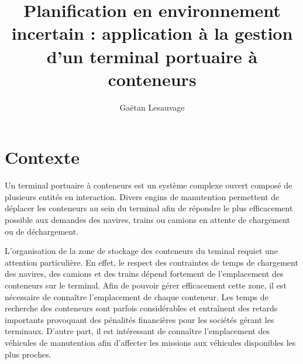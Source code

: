 \documentclass{roadef2010}
\begin{document}
\title{Planification en environnement incertain : application \`a la gestion d'un terminal portuaire \`{a} conteneurs}
\def\shorttitle{Planification avec incertitude : cas d'un terminal \`{a} conteneurs}
\author{Ga\"{e}tan Lesauvage}

{}

\maketitle
\thispagestyle{empty}


\section{Contexte}

Un terminal portuaire \`{a} conteneurs est un syst\`{e}me complexe ouvert compos\'{e} de plusieurs entit\'{e}s en interaction. Divers engins de manutention permettent de d\'{e}placer les conteneurs au sein du terminal afin de r\'{e}pondre le plus efficacement possible aux demandes des navires, trains ou camions en attente de chargement ou de d\'{e}chargement.


L'organisation de la zone de stockage des conteneurs du teminal requiet une attention particuli\`ere. 
En effet, le respect des contraintes de temps de chargement des navires, des camions et des trains d\'{e}pend fortement de l'emplacement des conteneurs sur le terminal.
Afin de pouvoir g\'{e}rer efficacement cette zone, il est n\'{e}cessaire de conna\^{i}tre l'emplacement de chaque conteneur. Les temps de recherche des conteneurs sont parfois consid\'{e}rables et entra\^{i}nent des retards importants provoquant des p\'{e}nalit\'{e}s financi\`{e}res pour les soci\'{e}t\'{e}s g\'{e}rant les terminaux.
D'autre part, il est int\'{e}ressant de conna\^{i}tre l'emplacement des v\'{e}hicules de manutention afin d'affecter les missions aux v\'{e}hicules disponibles les plus proches.
\end{document}
